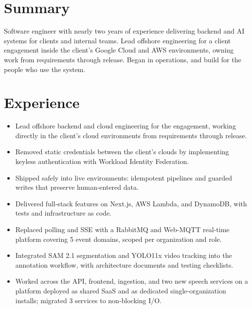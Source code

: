 \documentclass[10pt,a4paper]{article}
\begin{document}

\section{Summary}
Software engineer with nearly two years of experience delivering backend and AI systems for clients and internal teams. Lead offshore engineering for a client engagement inside the client's Google Cloud and AWS environments, owning work from requirements through release. Began in operations, and build for the people who use the system.

\section{Experience}

\begin{itemize}
  \item Lead offshore backend and cloud engineering for the engagement, working directly in the client's cloud environments from requirements through release.
  \item Removed static credentials between the client's clouds by implementing keyless authentication with Workload Identity Federation.
  \item Shipped safely into live environments: idempotent pipelines and guarded writes that preserve human-entered data.
  \item Delivered full-stack features on Next.js, AWS Lambda, and DynamoDB, with tests and infrastructure as code.
\end{itemize}

\begin{itemize}
  \item Replaced polling and SSE with a RabbitMQ and Web-MQTT real-time platform covering 5 event domains, scoped per organization and role.
  \item Integrated SAM 2.1 segmentation and YOLO11x video tracking into the annotation workflow, with architecture documents and testing checklists.
\end{itemize}

\begin{itemize}
  \item Worked across the API, frontend, ingestion, and two new speech services on a platform deployed as shared SaaS and as dedicated single-organization installs; migrated 3 services to non-blocking I/O.
\end{itemize}
\end{document}
